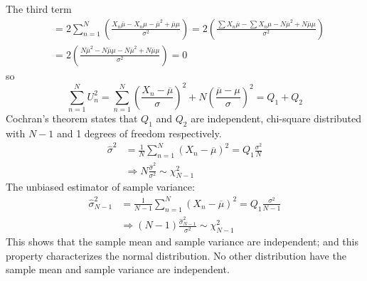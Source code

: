 The third term
\begin{align}
	& = 2\sum_{n=1}^N {\left(\frac {X_n \overline \mu - X_n \mu - {\overline \mu}^2 + \overline \mu \mu}{\sigma^2}\right)} = 2 {\left( \frac {\sum X_n \overline \mu -  \sum X_n \mu - N{\overline \mu}^2 + N\overline \mu \mu}{\sigma^2} \right)} \nonumber \\
	& = 2 {\left( \frac {N{\overline \mu}^2 -  N\overline \mu\mu - N{\overline \mu}^2 + N\overline \mu \mu}{\sigma^2} \right)} = 0\nonumber
\end{align}
so
\begin{equation}
	\sum_{n=1}^N U_n^2 = \sum_{n=1}^N {(\frac {X_n - \overline \mu}{\sigma})}^2 + N{(\frac {\overline \mu - \mu}{\sigma})}^2 = Q_1 + Q_2
\end{equation}
Cochran's theorem states that $Q_1$ and $Q_2$ are independent, chi-square distributed with $N-1$ and 1 degrees of freedom respectively.\\
\begin{align}
	\hat{\sigma}^2 & = \frac{1}{N} \sum_{n=1}^N (X_n - \overline \mu)^2 = Q_1\frac{\sigma^2}{N} \nonumber \\
	& \Rightarrow N \frac{\hat{\sigma}^2}{\sigma^2} \sim\chi^2_{N-1} \label{eq:svar}
\end{align}
The unbiased estimator of sample variance:
\begin{align}
	\hat{\sigma}_{N-1}^2 & = \frac{1}{N-1} \sum_{n=1}^N (X_n - \overline \mu)^2 = Q_1\frac{\sigma^2}{N-1} \nonumber \\
	& \Rightarrow (N-1) \frac{\hat{\sigma}_{N-1}^2}{\sigma^2} \sim\chi^2_{N-1} \label{eq:svar-unbias}
\end{align}
This shows that the sample mean and sample variance are independent; and this property characterizes the normal distribution. No other distribution have the sample mean and sample variance are independent.
